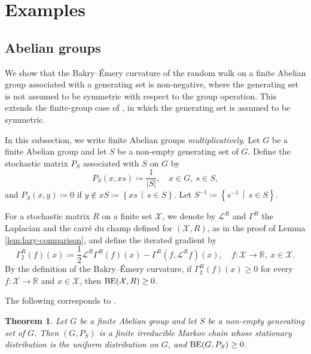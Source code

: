 \documentclass[a4paper, reqno, 11pt]{amsart}
\newtheorem{Thm}{Theorem}[section]
\theoremstyle{definition}
\begin{document}
\section{Examples}\label{sec:example}

\subsection{Abelian groups}\label{subsec:abelian}

We show that the Bakry--\'Emery curvature of the random walk on a finite Abelian group associated with a generating set is non-negative,
where the generating set is not assumed to be symmetric with respect to the group operation.
This extends the finite-group case of \cite[Theorem 2.3]{KKRT2016}, in which the generating set is assumed to be symmetric.

In this subsection, we write finite Abelian groups {\it multiplicatively}.
Let $G$ be a finite Abelian group and let $S$ be a non-empty generating set of $G$.
Define the stochastic matrix $P_{S}$ associated with $S$ on $G$ by
\begin{equation}\label{eq:tr-pb-def} 
P_{S}(x, xs) \coloneqq \frac{1}{|S|}, \quad x \in G,\ s \in S, 
\end{equation}
and $P_{S}(x,y) \coloneqq 0$ if $y \notin xS \coloneqq \left\{xs \,\middle|\, s \in S\right\}$. 
Let $S^{-1} \coloneqq \left\{s^{-1} \,\middle|\, s \in S\right\}$. 

For a stochastic matrix $R$ on a finite set $\mathcal{X}$,
we denote by $\mathcal{L}^{R}$ and $\Gamma^{R}$ the Laplacian and the carr\'e du champ defined for $(\mathcal{X}, R)$,
as in the proof of Lemma \ref{lem:lazy-comparison},
and define the iterated gradient by
\[ \Gamma_{2}^{R}(f)(x) \coloneqq \frac{1}{2} \mathcal{L}^{R}\Gamma^{R}(f)(x) - \Gamma^{R}(f, \mathcal{L}^{R} f)(x), \quad f \colon \mathcal{X} \to \mathbb{R},\ x \in \mathcal{X}. \]
By the definition of the Bakry--\'Emery curvature,
if $\Gamma_{2}^{R}(f)(x) \ge 0$ for every $f \colon \mathcal{X} \to \mathbb{R}$ and $x \in \mathcal{X}$,
then $\textup{BE}(\mathcal{X}, R) \ge 0$. 

The following corresponds to \cite[Theorem 2.3]{KKRT2016}. 

\begin{Thm}\label{thm:abelian}
Let $G$ be a finite Abelian group and let $S$ be a non-empty generating set of $G$. 
Then $(G, P_{S})$ is a finite irreducible Markov chain whose stationary distribution is the uniform distribution on $G$, and
$\textup{BE}(G, P_{S}) \ge 0$.
\end{Thm}
\end{document}
